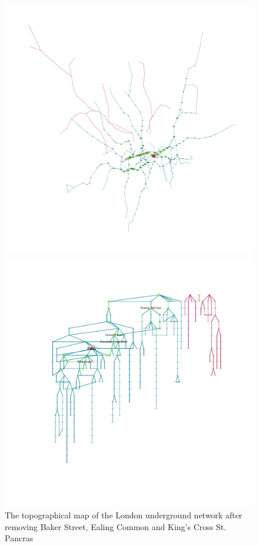 \documentclass[a4paper,reqno,]{article}
\begin{document}
\begin{figure}[H]
\centering
\begin{minipage}[b]{0.49\textwidth}
\centering
    \captionsetup{width=.9\linewidth}
    \includegraphics[clip, trim=3cm 3cm 3cm 2cm,width=1\textwidth]{images/NW/7_1.pdf}
    \caption{The topographical map of the London underground network after removing Baker Street, Ealing Common and King's Cross St. Pancras}\label{fig: 7_1}
\end{minipage}
\begin{minipage}[b]{0.5\textwidth}
\centering
    \captionsetup{width=.9\linewidth}
    \includegraphics[clip, trim=3cm 3cm 2cm 2cm,width=1\textwidth]{images/NW/7_2.pdf}

\end{minipage}
\end{figure}
\end{document}
